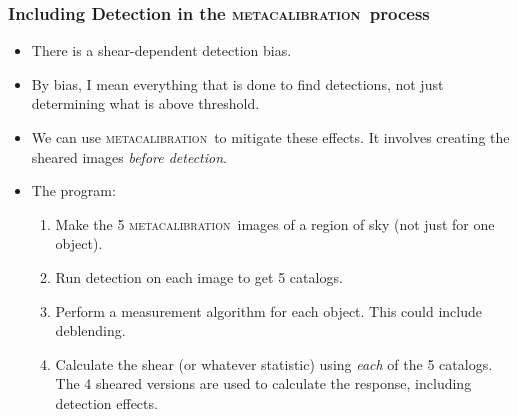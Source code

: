 \documentclass{beamer}
\newcommand{\mcal}{\textsc{metacalibration}}
\begin{document}
\frame
{
    \frametitle{Including Detection in the \mcal\ process}

 
    \begin{itemize}

        \item There is a {\color{lightsteelblue} shear-dependent detection bias}.

        \item By bias, I mean everything that is done to find detections,
            not just determining what is above threshold.

        \item We can use \mcal\ to mitigate these effects. It involves
            creating the sheared images {\color{lightsteelblue} {\em before detection}}.

        \item The program:
            \begin{enumerate}

                \item Make the 5 \mcal\ images of a region of sky (not just for
                    one object).

                \item Run detection on each image to get 5 catalogs.

                \item Perform a measurement algorithm for each object.  This
                    could include deblending.

                \item Calculate the shear (or whatever statistic) using {\em
                    each} of the 5 catalogs.  The 4 sheared versions are used
                    to calculate the response, including detection effects.

            \end{enumerate}

    \end{itemize}

}
\end{document}
